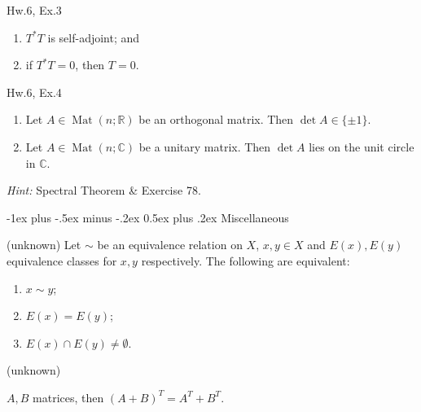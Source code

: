 \documentclass[10pt]{article} %
\makeatletter
\DeclareMathOperator{\Mat}{Mat}
\newcommand{\Hint}{\vspace{0.2em}\textit{Hint: }}
\renewcommand{\section}{\@startsection{section}{1}{0mm}%
                                {-1ex plus -.5ex minus -.2ex}%
                                {0.5ex plus .2ex}%
                                {\normalfont\large\bfseries}}
\makeatother
\begin{document}
\begin{multicols}{3}
\begin{exercise}{Hw.6, Ex.3}{}
        \begin{enumerate}[(1)]
            \setlength{\parskip}{0em}
            \item $T^*T$ is self-adjoint; and
            \item if $T^*T=0$, then $T=0$.
        \end{enumerate}

\end{exercise}

\begin{exercise}{Hw.6, Ex.4}{}

    \begin{enumerate}[(1)]
        \item Let $A \in \Mat(n;\mathbb{R})$ be an orthogonal matrix. Then $\det{A} \in \{\pm 1\}$.
        \item Let $A \in \Mat(n;\mathbb{C})$ be a unitary matrix. Then $\det{A}$ lies on the unit circle in $\mathbb{C}$.
    \end{enumerate}

    \Hint Spectral Theorem \& Exercise 78.

\end{exercise}


\section{Miscellaneous}

\begin{remark}{(unknown)}{}
    Let $\sim$ be an equivalence relation on $X$, $x,y \in X$ and $E(x), E(y)$ equivalence classes for $x,y$ respectively. The following are equivalent:

    \begin{enumerate}[(1)]
        \setlength{\parskip}{0em}
        \item $x \sim y$;
        \item $E(x) = E(y)$;
        \item $E(x) \cap E(y) \neq \emptyset$.
    \end{enumerate}
\end{remark}

\begin{proposition}{(unknown)}{}

    $A,B$ matrices, then $(A + B)^T = A^T + B^T$.


\end{proposition}
\end{multicols}
\end{document}
